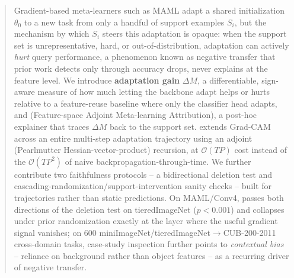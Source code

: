 \begin{abstract}
Gradient-based meta-learners such as MAML adapt a shared initialization $\theta_0$ to a new task from only a handful of support examples $S_i$, but the mechanism by which $S_i$ steers this adaptation is opaque: when the support set is unrepresentative, hard, or out-of-distribution, adaptation can actively \emph{hurt} query performance, a phenomenon known as negative transfer that prior work detects only through accuracy drops, never explains at the feature level. We introduce \textbf{adaptation gain} $\Delta M$, a differentiable, sign-aware measure of how much letting the backbone adapt helps or hurts relative to a feature-reuse baseline where only the classifier head adapts, and \textbf{\fama} (Feature-space Adjoint Meta-learning Attribution), a post-hoc explainer that traces $\Delta M$ back to the support set. \fama extends Grad-CAM across an entire multi-step adaptation trajectory using an adjoint (Pearlmutter Hessian-vector-product) recursion, at $\mathcal{O}(TP)$ cost instead of the $\mathcal{O}(TP^2)$ of naive backpropagation-through-time. We further contribute two faithfulness protocols -- a bidirectional deletion test and cascading-randomization/support-intervention sanity checks -- built for trajectories rather than static predictions. On MAML/Conv4, \fama passes both directions of the deletion test on tieredImageNet ($p<0.001$) and collapses under prior randomization exactly at the layer where the useful gradient signal vanishes; on 600 miniImageNet/tieredImageNet$\to$CUB-200-2011 cross-domain tasks, case-study inspection further points to \emph{contextual bias} -- reliance on background rather than object features -- as a recurring driver of negative transfer.
\end{abstract}

